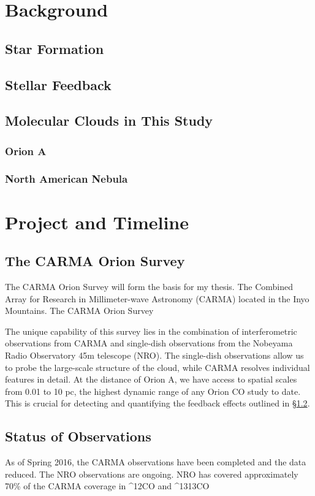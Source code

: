 \section{Background}\label{sec:bkgrd}
\subsection{Star Formation}\label{sec:sf}
\subsection{Stellar Feedback}\label{sec:feedback}
\subsection{Molecular Clouds in This Study}\label{sec:mc}
\subsubsection{Orion A}\label{sec:orion}
\subsubsection{North American Nebula}\label{sec:nan}

\section{Project and Timeline}\label{sec:project}
    \subsection{The CARMA Orion Survey}\label{sec:carma}
    The CARMA Orion Survey will form the basis for my thesis. The Combined Array for Research in Millimeter-wave Astronomy (CARMA) located in the Inyo Mountains. The CARMA Orion Survey %
    
    The unique capability of this survey lies in the combination of interferometric observations from CARMA and single-dish observations from the Nobeyama Radio Observatory 45m telescope (NRO). The single-dish observations allow us to probe the large-scale structure of the cloud, while CARMA resolves individual features in detail. At the distance of Orion A, we have access to spatial scales from 0.01 to 10 pc, the highest dynamic range of any Orion CO study to date. This is crucial for detecting and quantifying the feedback effects outlined in \S\ref{sec:feedback}.
    \subsection{Status of Observations}
    As of Spring 2016, the CARMA observations have been completed and the data reduced. The NRO observations are ongoing. NRO has covered approximately 70\% of the CARMA coverage in ^{12}CO and ^{13}13CO
